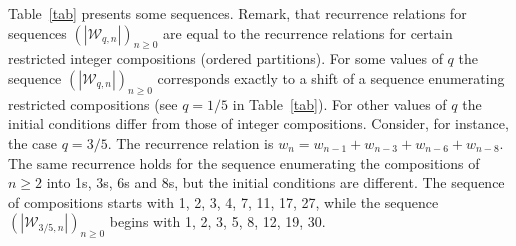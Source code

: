 \documentclass[a4paper,12pt]{article}
\theoremstyle{definition}
\newcommand{\W}{\mathcal{W}}
\let\ge\geqslant
\begin{document}
Table~\ref{tab} presents some sequences. Remark, that recurrence
relations for sequences $(|\W_{q,n}|)_{n\ge 0}$ are equal to the
recurrence relations for certain restricted integer compositions
(ordered partitions).  For some values of $q$ the sequence
$(|\W_{q,n}|)_{n\ge 0}$ corresponds exactly to a shift of a sequence
enumerating restricted compositions (see $q=1/5$ in
Table~\ref{tab}). For other values of $q$ the initial conditions
differ from those of integer compositions. Consider, for instance, the
case $q=3/5$.  The recurrence relation is $w_n = w_{n-1} + w_{n-3} +
w_{n-6} + w_{n-8}$.  The same recurrence holds for the sequence
enumerating the compositions of $n \ge 2$ into 1s, 3s, 6s and 8s, but
the initial conditions are different. The sequence of compositions
starts with 1, 2, 3, 4, 7, 11, 17, 27, while the sequence
$(|\W_{3/5,n}|)_{n\ge0}$ begins with 1, 2, 3, 5, 8, 12, 19, 30.
\end{document}
